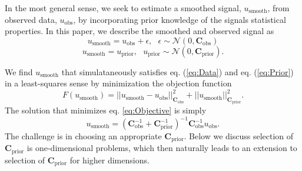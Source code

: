 \documentclass[10pt,a4paper]{article}
\begin{document}
In the most general sense, we seek to estimate a smoothed signal, $u_\mathrm{smooth}$, from observed data, $u_\mathrm{obs}$, by incorporating prior knowledge of the signals statistical properties.  In this paper, we describe the smoothed and observed signal as 
\begin{equation}\label{eq:Data}
  u_\mathrm{smooth} = u_\mathrm{obs} + \epsilon,\ \ \ \epsilon \sim \mathcal{N}(0,\mathbf{C}_\mathrm{obs})
\end{equation}
\begin{equation}\label{eq:Prior}
  u_\mathrm{smooth} = u_\mathrm{prior}, \ \ \ u_\mathrm{prior} \sim \mathcal{N}(0,\mathbf{C}_\mathrm{prior}).
\end{equation}

We find $u_\mathrm{smooth}$ that simulataneously satisfies eq. (\ref{eq:Data}) and eq. (\ref{eq:Prior}) in a least-squares sense by minimization the objection function
\begin{equation}\label{eq:Objective}
F(u_\mathrm{smooth}) = ||u_\mathrm{smooth} - u_\mathrm{obs}||_{\mathbf{C}_\mathrm{obs}}^2 + 
                       ||u_\mathrm{smooth}||_{\mathbf{C}_\mathrm{prior}}^2 .
\end{equation} 
The solution that minimizes eq. \ref{eq:Objective} is simply
\begin{equation}
u_\mathrm{smooth} = (\mathbf{C}_\mathrm{obs}^{-1} + 
                     \mathbf{C}_\mathrm{prior}^{-1})^{-1}
                     \mathbf{C}_\mathrm{obs}^{-1} u_\mathrm{obs} .
\end{equation} 
The challenge is in choosing an appropriate $\mathbf{C}_\mathrm{prior}$.  Below we discuss selection of $\mathbf{C}_\mathrm{prior}$ is one-dimensional problems, which then naturally leads to an extension to selection of $\mathbf{C}_\mathrm{prior}$ for higher dimensions.
\end{document}
